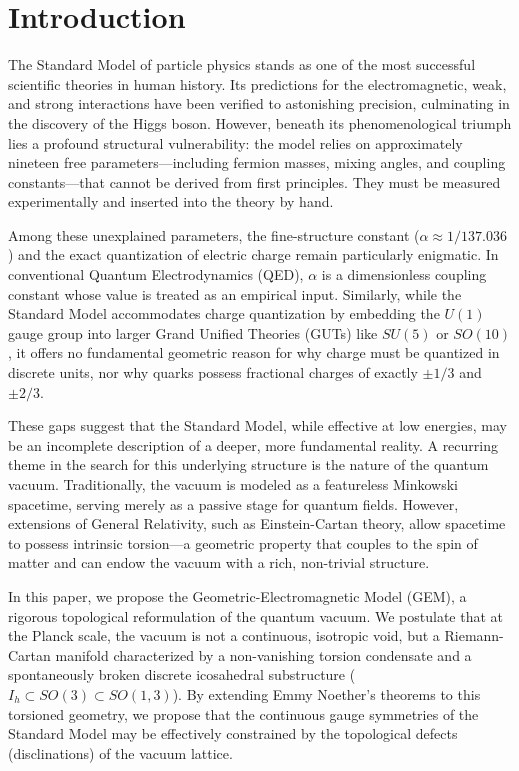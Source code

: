 \section{Introduction}
\label{sec:introduction}

The Standard Model of particle physics stands as one of the most successful scientific theories in human history. Its predictions for the electromagnetic, weak, and strong interactions have been verified to astonishing precision, culminating in the discovery of the Higgs boson. However, beneath its phenomenological triumph lies a profound structural vulnerability: the model relies on approximately nineteen free parameters—including fermion masses, mixing angles, and coupling constants—that cannot be derived from first principles. They must be measured experimentally and inserted into the theory by hand. 

Among these unexplained parameters, the fine-structure constant ($\alpha \approx 1/137.036$) and the exact quantization of electric charge remain particularly enigmatic. In conventional Quantum Electrodynamics (QED), $\alpha$ is a dimensionless coupling constant whose value is treated as an empirical input. Similarly, while the Standard Model accommodates charge quantization by embedding the $U(1)$ gauge group into larger Grand Unified Theories (GUTs) like $SU(5)$ or $SO(10)$, it offers no fundamental geometric reason for why charge must be quantized in discrete units, nor why quarks possess fractional charges of exactly $\pm 1/3$ and $\pm 2/3$.

These gaps suggest that the Standard Model, while effective at low energies, may be an incomplete description of a deeper, more fundamental reality. A recurring theme in the search for this underlying structure is the nature of the quantum vacuum. Traditionally, the vacuum is modeled as a featureless Minkowski spacetime, serving merely as a passive stage for quantum fields. However, extensions of General Relativity, such as Einstein-Cartan theory, allow spacetime to possess intrinsic torsion—a geometric property that couples to the spin of matter and can endow the vacuum with a rich, non-trivial structure.

In this paper, we propose the Geometric-Electromagnetic Model (GEM), a rigorous topological reformulation of the quantum vacuum. We postulate that at the Planck scale, the vacuum is not a continuous, isotropic void, but a Riemann-Cartan manifold characterized by a non-vanishing torsion condensate and a spontaneously broken discrete icosahedral substructure ($I_h \subset SO(3) \subset SO(1,3)$). By extending Emmy Noether’s theorems to this torsioned geometry, we propose that the continuous gauge symmetries of the Standard Model may be effectively constrained by the topological defects (disclinations) of the vacuum lattice.

